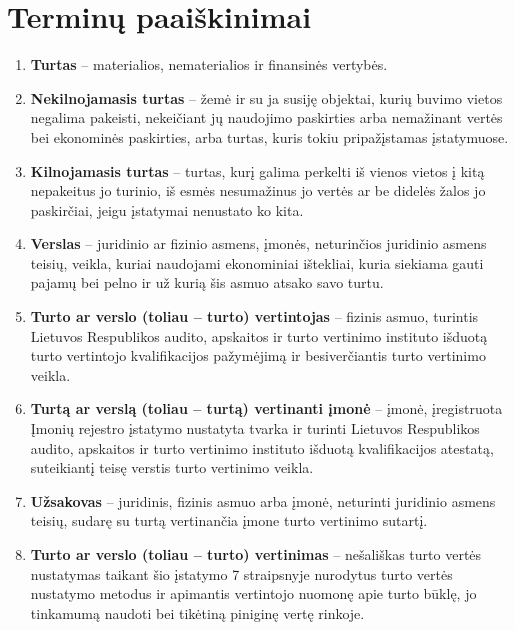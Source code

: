\section{Terminų paaiškinimai}

\begin{enumerate}
    \item \textbf{Turtas} – materialios, nematerialios ir finansinės vertybės.

    \item \textbf{Nekilnojamasis turtas} – žemė ir su ja susiję objektai, kurių buvimo vietos negalima pakeisti, nekeičiant jų naudojimo paskirties arba nemažinant vertės bei ekonominės paskirties, arba turtas, kuris tokiu pripažįstamas įstatymuose.

    \item \textbf{Kilnojamasis turtas} – turtas, kurį galima perkelti iš vienos vietos į kitą nepakeitus jo turinio, iš esmės nesumažinus jo vertės ar be didelės žalos jo paskirčiai, jeigu įstatymai nenustato ko kita.

    \item \textbf{Verslas} – juridinio ar fizinio asmens, įmonės, neturinčios juridinio asmens teisių, veikla, kuriai naudojami ekonominiai ištekliai, kuria siekiama gauti pajamų bei pelno ir už kurią šis asmuo atsako savo turtu.

    \item \textbf{Turto ar verslo (toliau – turto) vertintojas} – fizinis asmuo, turintis Lietuvos Respublikos audito, apskaitos ir turto vertinimo instituto išduotą turto vertintojo kvalifikacijos pažymėjimą ir besiverčiantis turto vertinimo veikla.

    \item \textbf{Turtą ar verslą (toliau – turtą) vertinanti įmonė} – įmonė, įregistruota Įmonių rejestro įstatymo nustatyta tvarka ir turinti Lietuvos Respublikos audito, apskaitos ir turto vertinimo instituto išduotą kvalifikacijos atestatą, suteikiantį teisę verstis turto vertinimo veikla.

    \item \textbf{Užsakovas} – juridinis, fizinis asmuo arba įmonė, neturinti juridinio asmens teisių, sudarę su turtą vertinančia įmone turto vertinimo sutartį.

    \item \textbf{Turto ar verslo (toliau – turto) vertinimas} – nešališkas turto vertės nustatymas taikant šio įstatymo 7 straipsnyje nurodytus turto vertės nustatymo metodus ir apimantis vertintojo nuomonę apie turto būklę, jo tinkamumą naudoti bei tikėtiną piniginę vertę rinkoje.


\end{enumerate}
